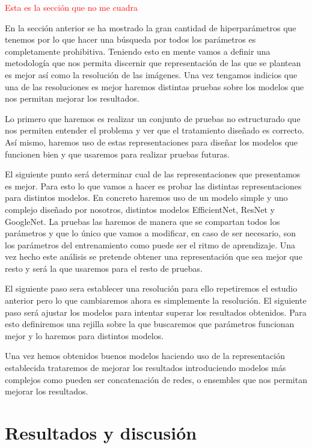 \documentclass[a4paper,12pt,twoside,titlepage]{article}
\newcommand{\red}[1]{\textcolor{red}{#1}}
\begin{document}
\red{Esta es la sección que no me cuadra}

En la sección anterior se ha mostrado la gran cantidad de hiperparámetros que tenemos por lo que hacer una búsqueda por todos los parámetros es completamente prohibitiva. Teniendo esto en mente vamos a definir una metodología que nos permita discernir que representación de las que se plantean es mejor así como la resolución de las imágenes. Una vez tengamos indicios que una de las resoluciones es mejor haremos distintas pruebas sobre los modelos que nos permitan mejorar los resultados.

Lo primero que haremos es realizar un conjunto de pruebas no estructurado que nos permiten entender el problema y ver que el tratamiento diseñado es correcto. Así mismo, haremos uso de estas representaciones para diseñar los modelos que funcionen bien y que usaremos para realizar pruebas futuras.

El siguiente punto será determinar cual de las representaciones que presentamos es mejor. Para esto lo que vamos a hacer es probar las distintas representaciones para distintos modelos. En concreto haremos uso de un modelo simple y uno complejo diseñado por nosotros, distintos modelos EfficientNet, ResNet y GoogleNet. La pruebas las haremos de manera que se compartan todos los parámetros y que lo único que vamos a modificar, en caso de ser necesario, son los parámetros del entrenamiento como puede ser el ritmo de aprendizaje. Una vez hecho este análisis se pretende obtener una representación que sea mejor que resto y será la que usaremos para el resto de pruebas. 

El siguiente paso sera establecer una resolución para ello repetiremos el estudio anterior pero lo que cambiaremos ahora es simplemente la resolución. El siguiente paso será ajustar los modelos para intentar superar los resultados obtenidos. Para esto definiremos una rejilla sobre la que buscaremos que parámetros funcionan mejor y lo haremos para distintos modelos.

Una vez hemos obtenidos buenos modelos haciendo uso de la representación establecida trataremos de mejorar los resultados introduciendo modelos más complejos como pueden ser concatenación de redes, o ensembles que nos permitan mejorar los resultados.

\section{Resultados y discusión}
\end{document}
